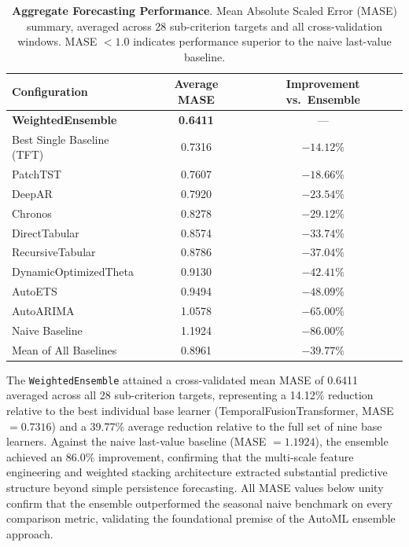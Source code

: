 \documentclass[12pt,a4paper]{article}
\begin{document}
\begin{table}[H]
\centering
\caption{\textbf{Aggregate Forecasting Performance}. Mean Absolute Scaled Error (MASE) summary, averaged across 28 sub-criterion targets and all cross-validation windows. MASE $< 1.0$ indicates performance superior to the naive last-value baseline.}
\label{tab:mase_summary}
\small
\begin{tabular}{lcc}
\toprule
\textbf{Configuration} & \textbf{Average MASE} & \textbf{Improvement vs.\ Ensemble} \\
\midrule
\textbf{WeightedEnsemble} & \textbf{0.6411} & --- \\
Best Single Baseline (TFT) & 0.7316 & $-14.12\%$ \\
PatchTST            & 0.7607 & $-18.66\%$ \\
DeepAR              & 0.7920 & $-23.54\%$ \\
Chronos             & 0.8278 & $-29.12\%$ \\
DirectTabular       & 0.8574 & $-33.74\%$ \\
RecursiveTabular    & 0.8786 & $-37.04\%$ \\
DynamicOptimizedTheta & 0.9130 & $-42.41\%$ \\
AutoETS             & 0.9494 & $-48.09\%$ \\
AutoARIMA           & 1.0578 & $-65.00\%$ \\
Naive Baseline    & 1.1924 & $-86.00\%$ \\
\midrule
Mean of All Baselines & 0.8961 & $-39.77\%$ \\
\bottomrule
\end{tabular}
\end{table}

\FloatBarrier

The \texttt{WeightedEnsemble} attained a cross-validated mean MASE of 0.6411 averaged across all 28 sub-criterion targets, representing a 14.12\% reduction relative to the best individual base learner (TemporalFusionTransformer, MASE $= 0.7316$) and a 39.77\% average reduction relative to the full set of nine base learners. Against the naive last-value baseline (MASE $= 1.1924$), the ensemble achieved an 86.0\% improvement, confirming that the multi-scale feature engineering and weighted stacking architecture extracted substantial predictive structure beyond simple persistence forecasting. All MASE values below unity confirm that the ensemble outperformed the seasonal naive benchmark on every comparison metric, validating the foundational premise of the AutoML ensemble approach.
\end{document}

